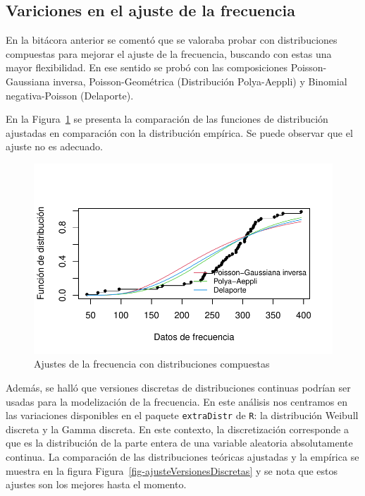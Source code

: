 \documentclass[
  letterpaper,
  onepage,
  openany]{scrreprt}
\begin{document}
\hypertarget{variciones-en-el-ajuste-de-la-frecuencia}{%
\subsection{Variciones en el ajuste de la
frecuencia}\label{variciones-en-el-ajuste-de-la-frecuencia}}

En la bitácora anterior se comentó que se valoraba probar con
distribuciones compuestas para mejorar el ajuste de la frecuencia,
buscando con estas una mayor flexibilidad. En ese sentido se probó con
las composiciones Poisson-Gaussiana inversa, Poisson-Geométrica
(Distribución Polya-Aeppli) y Binomial negativa-Poisson (Delaporte).

En la Figura~\ref{fig-ajusteComp} se presenta la comparación de las
funciones de distribución ajustadas en comparación con la distribución
empírica. Se puede observar que el ajuste no es adecuado.

\begin{figure}[H]

\caption{\label{fig-ajusteComp}Ajustes de la frecuencia con
distribuciones compuestas}

{\centering \includegraphics{./Bit4_files/figure-pdf/fig-ajusteComp-1.pdf}

}

\end{figure}

Además, se halló que versiones discretas de distribuciones continuas
podrían ser usadas para la modelización de la frecuencia. En este
análisis nos centramos en las variaciones disponibles en el paquete
\texttt{extraDistr} de \texttt{R}: la distribución Weibull discreta y la
Gamma discreta. En este contexto, la discretización corresponde a que es
la distribución de la parte entera de una variable aleatoria
absolutamente continua. La comparación de las distribuciones teóricas
ajustadas y la empírica se muestra en la figura
Figura~\ref{fig-ajusteVersionesDiscretas} y se nota que estos ajustes
son los mejores hasta el momento.
\end{document}
